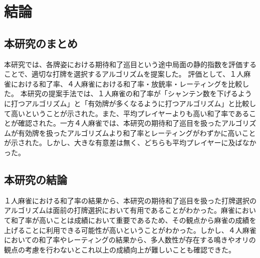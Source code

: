 \chapter{結論}
\label{chap:conclusion}
\section{本研究のまとめ}
本研究では、各牌姿における期待和了巡目という途中局面の静的指数を評価することで、適切な打牌を選択するアルゴリズムを提案した。
評価として、１人麻雀における和了率、４人麻雀における和了率・放銃率・レーティングを比較した。
本研究の提案手法では、１人麻雀の和了率が「シャンテン数を下げるように打つアルゴリズム」と「有効牌が多くなるように打つアルゴリズム」と比較して高いということが示された。また、平均プレイヤーよりも高い和了率であることが確認された。一方４人麻雀では、本研究の期待和了巡目を扱ったアルゴリズムが有効牌を扱ったアルゴリズムより和了率とレーティングがわずかに高いことが示された。しかし、大きな有意差は無く、どちらも平均プレイヤーに及ばなかった。

\section{本研究の結論}
１人麻雀における和了率の結果から、本研究の期待和了巡目を扱った打牌選択のアルゴリズムは面前の打牌選択において有用であることがわかった。麻雀において和了率が高いことは成績において重要であるため、その観点から麻雀の成績を上げることに利用できる可能性が高いということがわかった。しかし、４人麻雀においての和了率やレーティングの結果から、多人数性が存在する鳴きやオリの観点の考慮を行わないとこれ以上の成績向上が難しいことも確認できた。

